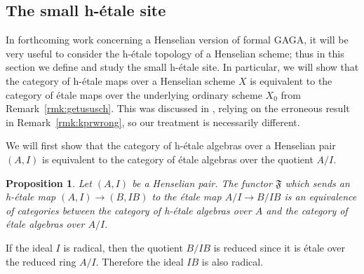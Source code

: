 \documentclass[12pt]{article}
\newcommand{\mf}[1]{\mathfrak{#1}}
\newcommand{\Et}{\'etale\xspace}
\newcommand{\hetale}{h-\'etale\xspace}
\newtheorem{proposition}[theorem]{Proposition}
\theoremstyle{definition}
\numberwithin{equation}{subsection}
\begin{document}
\subsection{The small \hetale site}\label{sub:hetsite}

In forthcoming work \cite{ghga} concerning a Henselian version of formal GAGA, it will be very useful to consider the \hetale topology of a Henselian scheme; thus in this section we define and study the small \hetale site. In particular, we will show that the category of \hetale maps over a Henselian scheme $X$ is equivalent to the category of \Et maps over the underlying ordinary scheme $X_0$ from Remark~\ref{rmk:getususch}. This was discussed in \cite[Theorem 1]{cox1}, relying on the erroneous result in Remark~\ref{rmk:kprwrong}, so our treatment is necessarily different.

We will first show that the category of \hetale algebras over a Henselian pair $(A,I)$ is equivalent to the category of \Et algebras over the quotient $A/I$. 

\begin{proposition}\label{prop:affcatequiv} Let $(A,I)$ be a Henselian pair. The functor $\mf{F}$ which sends an \hetale map $(A,I) \to (B,IB)$ to the \Et map $A/I \to B/IB$ is an equivalence of categories between the category of \hetale algebras over $A$ and the category of \Et algebras over $A/I$.
\end{proposition}
If the ideal $I$ is radical, then the quotient $B/IB$ is reduced since it is \Et over the reduced ring $A/I$. Therefore the ideal $IB$ is also radical.
\end{document}

